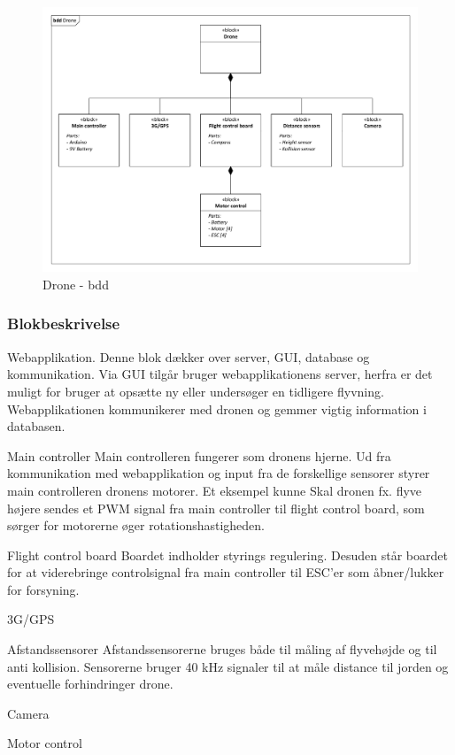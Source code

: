 \begin{figure}[H]
\centering
\includegraphics[width=1\textwidth]{Billeder/BDD/bdd_drone.pdf}
\caption{Drone - bdd}
\label{fig:bdd_drone}
\end{figure}


\subsubsection{Blokbeskrivelse}

Webapplikation.
Denne blok dækker over server, GUI, database og kommunikation. Via GUI tilgår bruger webapplikationens server, herfra er det muligt for bruger at opsætte ny eller undersøger en tidligere flyvning. Webapplikationen kommunikerer med dronen og gemmer vigtig information i databasen.

Main controller
Main controlleren fungerer som dronens hjerne. Ud fra kommunikation med webapplikation og input fra de forskellige sensorer styrer main controlleren dronens motorer. Et eksempel kunne Skal dronen fx. flyve højere sendes et PWM signal fra main controller til flight control board, som sørger for motorerne øger rotationshastigheden. 

Flight control board
Boardet indholder styrings regulering. Desuden står boardet for at viderebringe controlsignal fra main controller til ESC'er som åbner/lukker for forsyning. 

3G/GPS

Afstandssensorer
Afstandssensorerne bruges både til måling af flyvehøjde og til anti kollision. Sensorerne bruger 40 kHz signaler til at måle distance til jorden og eventuelle forhindringer drone.

Camera



Motor control

